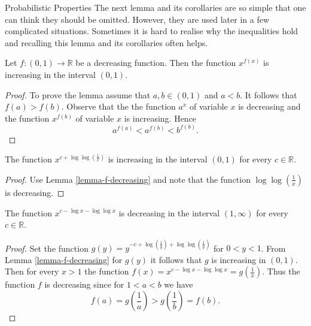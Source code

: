 \begin{section}{Probabilistic Properties}
The next lemma and its corollaries are so simple that one can think they should be omitted. However, they are used later in a few complicated situations. Sometimes it is hard to realise why the inequalities hold and recalling this lemma and its corollaries often helps.
\begin{lemma}
\label{lemma-f-decreasing}
Let $f: (0, 1) \rightarrow \mathbb{R}$ be a decreasing function. Then the function $x ^ {f(x)}$ is increasing in the interval $(0, 1)$.
\end{lemma}
\begin{proof}
To prove the lemma assume that $a, b \in (0, 1)$ and $a < b$. It follows that $f(a) > f(b)$. Observe that the the function $a ^ x$ of variable $x$ is decreasing and the function $x ^ {f(b)}$ of variable $x$ is increasing. Hence
\[
a ^ {f(a)} < a ^ {f(b)} < b ^ {f(b)} \text{.}
\]
\end{proof}

\begin{corollary}
\label{corollary-f0}
The function $x ^ {c + \log \log \left(\frac{1}{x}\right)}$ is increasing in the interval $(0, 1)$ for every $c \in \mathbb{R}$.
\end{corollary}
\begin{proof}
Use Lemma \ref{lemma-f-decreasing} and note that the function $\log \log \left(\frac{1}{x}\right)$ is decreasing.
\end{proof}

\begin{corollary}
\label{corollary-f1}
The function $x ^ {c - \log x - \log \log x}$ is decreasing in the interval $(1, \infty)$ for every $c \in \mathbb{R}$.
\end{corollary}
\begin{proof}
Set the function $g(y) = y ^ {-c + \log \left(\frac{1}{y}\right) + \log \log \left(\frac{1}{y}\right)}$ for $0 < y < 1$. From Lemma \ref{lemma-f-decreasing} for $g(y)$ it follows that $g$ is increasing in $(0, 1)$. Then for every $x > 1$ the function $f(x) = x ^ {c - \log x - \log \log x} = g\left(\frac{1}{x}\right)$. Thus the function $f$ is decreasing since for $1 < a < b$ we have
\[
	f(a) = g\left(\frac{1}{a}\right) > g\left(\frac{1}{b}\right) = f(b) \text{.}
\] 
\end{proof}


\end{section}
